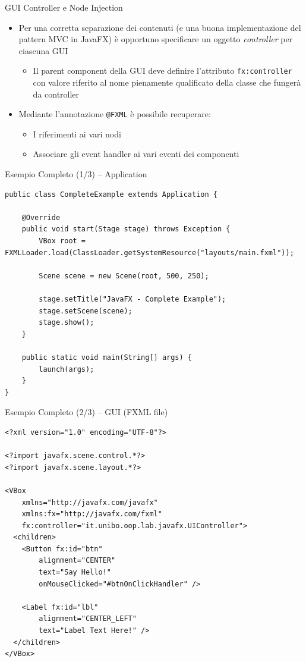 \documentclass[xcolor=dvipsnames,presentation]{beamer}
\begin{document}
\begin{frame}{GUI Controller e Node Injection}
\begin{itemize}\itemsep20pt
\item Per una corretta separazione dei contenuti (e una buona implementazione del pattern MVC in JavaFX) è opportuno specificare un oggetto \emph{controller} per ciascuna GUI
\begin{itemize}
\item Il parent component della GUI deve definire l'attributo \texttt{fx:controller} con valore riferito al nome pienamente qualificato della classe che fungerà da controller
\end{itemize}
\item Mediante l'annotazione \texttt{@FXML} è possibile recuperare:
\begin{itemize}
\item I riferimenti ai vari nodi
\item Associare gli event handler ai vari eventi dei componenti
\end{itemize}
\end{itemize}
\end{frame}

\begin{frame}[fragile]{Esempio Completo (1/3) -- Application}
\begin{lstlisting}
public class CompleteExample extends Application {

	@Override
	public void start(Stage stage) throws Exception {
		VBox root = FXMLLoader.load(ClassLoader.getSystemResource("layouts/main.fxml"));

		Scene scene = new Scene(root, 500, 250);

		stage.setTitle("JavaFX - Complete Example");
		stage.setScene(scene);
		stage.show();
	}

	public static void main(String[] args) {
		launch(args);
	}
}
\end{lstlisting}
\end{frame}

\begin{frame}[fragile]{Esempio Completo (2/3) -- GUI (FXML file)}
\begin{lstlisting}
<?xml version="1.0" encoding="UTF-8"?>

<?import javafx.scene.control.*?>
<?import javafx.scene.layout.*?>

<VBox
    xmlns="http://javafx.com/javafx"
    xmlns:fx="http://javafx.com/fxml"
	fx:controller="it.unibo.oop.lab.javafx.UIController">
  <children>
    <Button fx:id="btn"
    	alignment="CENTER"
    	text="Say Hello!"
    	onMouseClicked="#btnOnClickHandler" />

    <Label fx:id="lbl"
    	alignment="CENTER_LEFT"
    	text="Label Text Here!" />
  </children>
</VBox>
\end{lstlisting}
\end{frame}
\end{document}
